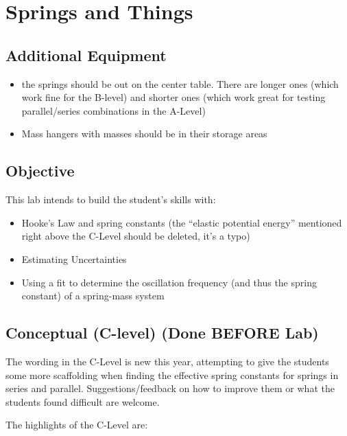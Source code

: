 \documentclass[fleqn,letterpaper]{article}
\begin{document}
\cfoot{}
\headsep=25pt

\section*{Springs and Things}

\subsection*{Additional Equipment}

\begin{itemize}
  \item{the springs should be out on the center table.  There are longer ones (which work fine for the B-level) and shorter ones (which work great for testing parallel/series combinations in the A-Level)}
  \item{Mass hangers with masses should be in their storage areas}
\end{itemize}

\subsection*{Objective}

This lab intends to build the student's skills with:
%
\begin{itemize}
 \item{Hooke's Law and spring constants (the ``elastic potential energy'' mentioned right above the C-Level should be deleted, it's a typo)}
 \item{Estimating Uncertainties}
 \item{Using a fit to determine the oscillation frequency (and thus the spring constant) of a spring-mass system}
\end{itemize}
%

\subsection*{Conceptual (C-level) (Done BEFORE Lab)}

The wording in the C-Level is new this year, attempting to give the students some more scaffolding when finding the effective spring constants for springs in series and parallel.  Suggestions/feedback on how to improve them or what the students found difficult are welcome.

The highlights of the C-Level are:
\end{document}
